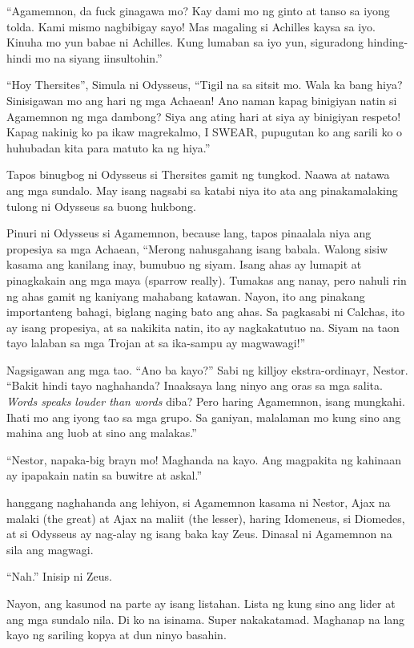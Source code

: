 \documentclass[12pt,letterpaper]{report}
\begin{document}
``Agamemnon, da fuck ginagawa mo? Kay dami mo ng ginto at tanso sa iyong tolda. Kami mismo nagbibigay sayo! Mas magaling si Achilles kaysa sa iyo. Kinuha mo yun babae ni Achilles. Kung lumaban sa iyo yun, siguradong hinding-hindi mo na siyang iinsultohin.''

``Hoy Thersites'', Simula ni Odysseus, ``Tigil na sa sitsit mo. Wala ka bang hiya? Sinisigawan mo ang hari ng mga Achaean! Ano naman kapag binigiyan natin si Agamemnon ng mga dambong? Siya ang ating hari at siya ay binigiyan respeto! Kapag nakinig ko pa ikaw magrekalmo, I SWEAR, pupugutan ko ang sarili ko o huhubadan kita para matuto ka ng hiya.''

Tapos binugbog ni Odysseus si Thersites gamit ng tungkod. Naawa at natawa ang mga sundalo. May isang nagsabi sa katabi niya ito ata ang pinakamalaking tulong ni Odysseus sa buong hukbong.

Pinuri ni Odysseus si Agamemnon, because lang, tapos pinaalala niya ang propesiya sa mga Achaean, ``Merong nahusgahang isang babala. Walong sisiw kasama ang kanilang inay, bumubuo ng siyam. Isang ahas ay lumapit at pinagkakain ang mga maya (sparrow really). Tumakas ang nanay, pero nahuli rin ng ahas gamit ng kaniyang mahabang katawan. Nayon, ito ang pinakang importanteng bahagi, biglang naging bato ang ahas. Sa pagkasabi ni Calchas, ito ay isang propesiya, at sa nakikita natin, ito ay nagkakatutuo na. Siyam na taon tayo lalaban sa mga Trojan at sa ika-sampu ay magwawagi!''

Nagsigawan ang mga tao. ``Ano ba kayo?'' Sabi ng killjoy ekstra-ordinayr, Nestor. ``Bakit hindi tayo naghahanda? Inaaksaya lang ninyo ang oras sa mga salita. \textit{Words speaks louder than words} diba? Pero haring Agamemnon, isang mungkahi. Ihati mo ang iyong tao sa mga grupo. Sa ganiyan, malalaman mo kung sino ang mahina ang luob at sino ang malakas.''

``Nestor, napaka-big brayn mo! Maghanda na kayo. Ang magpakita ng kahinaan ay ipapakain natin sa buwitre at askal.''

hanggang naghahanda ang lehiyon, si Agamemnon kasama ni Nestor, Ajax na malaki (the great) at Ajax na maliit (the lesser), haring Idomeneus, si Diomedes, at si Odysseus ay nag-alay ng isang baka kay Zeus. Dinasal ni Agamemnon na sila ang magwagi.

``Nah.'' Inisip ni Zeus.

Nayon, ang kasunod na parte ay isang listahan. Lista ng kung sino ang lider at ang mga sundalo nila. Di ko na isinama. Super nakakatamad. Maghanap na lang kayo ng sariling kopya at dun ninyo basahin.
\end{document}
